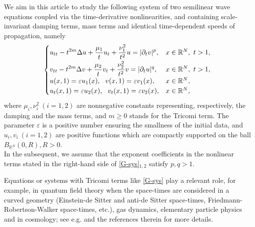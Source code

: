 \documentclass[12pt,leqno]{amsart}
\numberwithin{equation}{section}
\theoremstyle{remark}
\newcommand{\m}{m}
\newcommand{\M}{m}
\def\R{{\mathbb{R}}}
\def\d{\displaystyle}
\def\e{{\varepsilon}}
\begin{document}
We aim in this article to study the following system of two semilinear wave equations coupled via the time-derivative nonlinearities, and containing    scale-invariant damping terms,  mass terms and identical time-dependent speeds of propagation, namely
\begin{align}\label{G-sys}
\begin{cases}\d u_{tt}-t^{2 \m}\Delta u +\frac{\mu_1}{t}u_t+\frac{\nu_1^2}{t^2}u=|\partial_t v|^p, &  x\in \mathbb{R}^N, \ t>1, \vspace{.1cm}\\
\d v_{tt}-t^{2 \M}\Delta v +\frac{\mu_2}{t}v_t+\frac{\nu_2^2}{t^2}v=|\partial_t u|^q, &  x\in \R^N, \ t>1,\\
u(x,1)=\e u_1(x), \ \ v(x,1)=\e v_1(x), & x\in \mathbb{R}^N, \\ u_t(x,1)=\e u_2(x), \ \  v_t(x,1)=\varepsilon v_2(x), & x\in \mathbb{R}^N,
\end{cases}
\end{align} 
where $\mu_i,\nu^2_i \ (i=1,2)$ are nonnegative constants representing, respectively, the damping and the mass terms, and $m \ge 0$ stands for the Tricomi term.  The parameter $\e$ is a positive number ensuring the smallness of the initial
data,  and $u_i,v_i\ (i=1,2)$  are positive functions which are compactly supported on the ball $B_{\R^N}(0,R), R>0$.\\
In the subsequent, we assume that the exponent coefficients in the nonlinear terms stated in the right-hand side of \eqref{G-sys}$_{1,2}$ satisfy  $p, q>1$.


Equations or systems  with Tricomi terms like \eqref{G-sys} play a relevant role, for example,  in  quantum field theory when the space-times are considered in a curved geometry (Einstein-de Sitter and anti-de Sitter space-times,
Friedmann-Robertson-Walker space-times, etc.), gas dynamics, elementary particle physics and in cosmology; see e.g. \cite{Yagdjian} and the references therein for more details.
\end{document}
